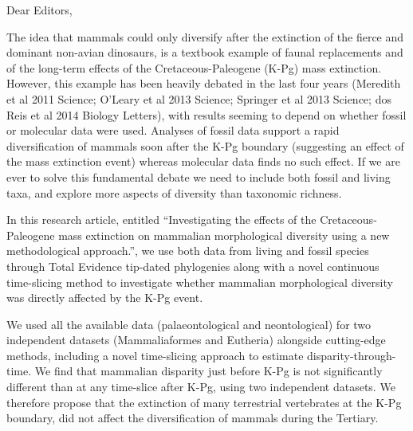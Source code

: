 \documentclass[11pt]{letter}
\begin{document}
\begin{letter}{}
\opening{Dear Editors,}

The idea that mammals could only diversify after the extinction of the fierce and dominant non-avian dinosaurs, is a textbook example of faunal replacements and of the long-term effects of the Cretaceous-Paleogene (K-Pg) mass extinction.
However, this example has been heavily debated in the last four years (Meredith et al 2011 Science; O'Leary et al 2013 Science; Springer et al 2013 Science; dos Reis et al 2014 Biology Letters), with results seeming to depend on whether fossil or molecular data were used.
Analyses of fossil data support a rapid diversification of mammals soon after the K-Pg boundary (suggesting an effect of the mass extinction event) whereas molecular data finds no such effect.
If we are ever to solve this fundamental debate we need to include both fossil and living taxa, and explore more aspects of diversity than taxonomic richness.

In this research article, entitled ``Investigating the effects of the Cretaceous-Paleogene mass extinction on mammalian morphological diversity using a new methodological approach.'', we use both data from living and fossil species through Total Evidence tip-dated phylogenies along with a novel continuous time-slicing method to investigate whether mammalian morphological diversity was directly affected by the K-Pg event.

We used all the available data (palaeontological and neontological) for two independent datasets (Mammaliaformes and Eutheria) alongside cutting-edge methods, including a novel time-slicing approach to estimate disparity-through-time.
We find that mammalian disparity just before K-Pg is not significantly different than at any time-slice after K-Pg, using two independent datasets.
We therefore propose that the extinction of many terrestrial vertebrates at the K-Pg boundary, did not affect the diversification of mammals during the Tertiary. 



\end{letter}
\end{document}
